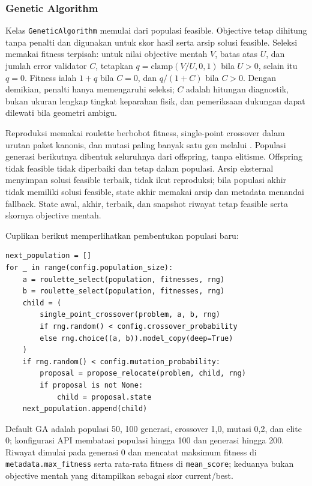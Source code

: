 \documentclass[12pt,a4paper]{article}
\begin{document}
\subsubsection{Genetic Algorithm}
Kelas \texttt{GeneticAlgorithm} memulai dari populasi feasible. Objective tetap dihitung tanpa penalti dan digunakan untuk skor hasil serta arsip solusi feasible. Seleksi memakai fitness terpisah: untuk nilai objective mentah $V$, batas atas $U$, dan jumlah error validator $C$, tetapkan $q=\mathrm{clamp}(V/U,0,1)$ bila $U>0$, selain itu $q=0$. Fitness ialah $1+q$ bila $C=0$, dan $q/(1+C)$ bila $C>0$. Dengan demikian, penalti hanya memengaruhi seleksi; $C$ adalah hitungan diagnostik, bukan ukuran lengkap tingkat keparahan fisik, dan pemeriksaan dukungan dapat dilewati bila geometri ambigu.

Reproduksi memakai roulette berbobot fitness, single-point crossover dalam urutan paket kanonis, dan mutasi paling banyak satu gen melalui . Populasi generasi berikutnya dibentuk seluruhnya dari offspring, tanpa elitisme. Offspring tidak feasible tidak diperbaiki dan tetap dalam populasi. Arsip eksternal menyimpan solusi feasible terbaik, tidak ikut reproduksi; bila populasi akhir tidak memiliki solusi feasible, state akhir memakai arsip dan metadata menandai fallback. State awal, akhir, terbaik, dan snapshot riwayat tetap feasible serta skornya objective mentah.

Cuplikan berikut memperlihatkan pembentukan populasi baru:
\begin{lstlisting}[emph={next_population,roulette_select,single_point_crossover,propose_relocate},caption={Pembentukan offspring GA},label={lst:ga-generation}]
next_population = []
for _ in range(config.population_size):
    a = roulette_select(population, fitnesses, rng)
    b = roulette_select(population, fitnesses, rng)
    child = (
        single_point_crossover(problem, a, b, rng)
        if rng.random() < config.crossover_probability
        else rng.choice((a, b)).model_copy(deep=True)
    )
    if rng.random() < config.mutation_probability:
        proposal = propose_relocate(problem, child, rng)
        if proposal is not None:
            child = proposal.state
    next_population.append(child)
\end{lstlisting}

Default GA adalah populasi 50, 100 generasi, crossover 1,0, mutasi 0,2, dan elite 0; konfigurasi API membatasi populasi hingga 100 dan generasi hingga 200. Riwayat dimulai pada generasi 0 dan mencatat maksimum fitness di \texttt{metadata.max\_fitness} serta rata-rata fitness di \texttt{mean\_score}; keduanya bukan objective mentah yang ditampilkan sebagai skor current/best.
\end{document}

